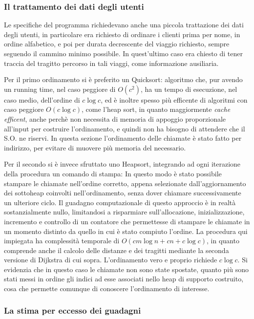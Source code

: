 \documentclass[a4paper,11pt]{Article}
\begin{document}
\subsubsection{Il trattamento dei dati degli utenti}

Le specifiche del programma richiedevano anche una piccola trattazione dei dati degli utenti, in particolare era richiesto di ordinare i clienti prima per nome, in ordine alfabetico, e poi per durata decrescente del viaggio richiesto, sempre seguendo il cammino minimo possibile. In quest'ultimo caso era chiesto di tener traccia del tragitto percorso in tali viaggi, come informazione ausiliaria.

Per il primo ordinamento si è preferito un Quicksort: algoritmo che, pur avendo un running time, nel caso peggiore di $O(c^2)$, ha un tempo di esecuzione, nel caso medio, dell'ordine di $c\log{c}$, ed è inoltre spesso più efficente di algoritmi con caso peggiore $O(c\log{c})$, come l'heap sort, in quanto maggiormente \textit{cache efficent}, anche perchè non necessita di memoria di appoggio proporzionale all'input per costruire l'ordinamento, e quindi non ha bisogno di attendere che il S.O. ne riservi.
In questa sezione l'ordinamento delle chiamate è stato fatto per indirizzo, per evitare di muovere più memoria del necessario.

Per il secondo si è invece sfruttato uno Heapsort, integrando ad ogni iterazione della procedura un comando di stampa: In questo modo è stato possibile stampare le chiamate nell'ordine corretto, appena selezionate dall'aggiornamento dei sottoheap coinvolti nell'ordinamento, senza dover chiamare successivamente un ulteriore ciclo. Il guadagno computazionale di questo approccio è in realtà sostanzialmente nullo, limitandosi a risparmiare sull'allocazione, inizializzazione, incremento e controllo di un contatore che permettesse di stampare le chiamate in un momento distinto da quello in cui è stato compiuto l'ordine. La procedura qui impiegata ha complessità temporale di $O(cm\log{n} + cn + c\log{c})$, in quanto comprende anche il calcolo delle distanze e dei tragitti mediante la seconda versione di Dijkstra di cui sopra. L'ordinamento vero e proprio richiede $c\log{c}$.
Si evidenzia che in questo caso le chiamate non sono state spostate, quanto più sono stati messi in ordine gli indici ad esse associati nello heap di supporto costruito, cosa che permette comunque di conoscere l'ordinamento di interesse.

\subsubsection{La stima per eccesso dei guadagni}
\end{document}
